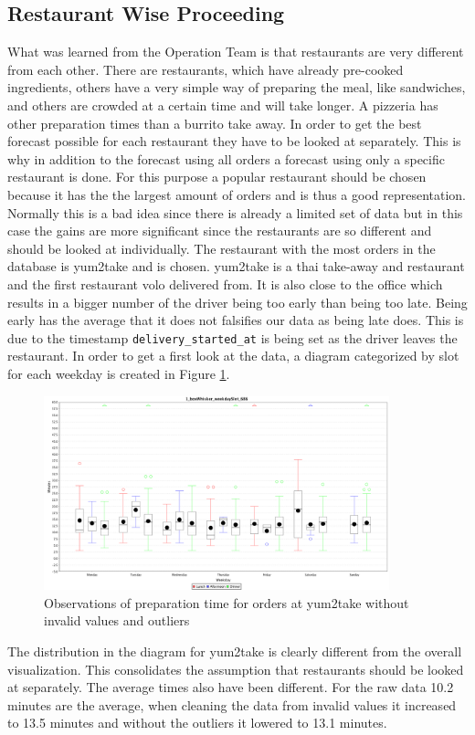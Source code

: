 \subsection{Restaurant Wise Proceeding}\label{subsection:Restaurant Wise Proceeding}
What was learned from the Operation Team is that restaurants are very different from each other. There are restaurants, which have already pre-cooked ingredients, others have a very simple way of preparing the meal, like sandwiches, and others are crowded at a certain time and will take longer. A pizzeria has other preparation times than a burrito take away.\newline
In order to get the best forecast possible for each restaurant they have to be looked at separately. This is why in addition to the forecast using all orders a forecast using only a specific restaurant is done. For this purpose a popular restaurant should be chosen because it has the the largest amount of orders and is thus a good representation. Normally this is a bad idea since there is already a limited set of data but in this case the gains are more significant since the restaurants are so different and should be looked at individually.\newline
The restaurant with the most orders in the database is yum2take and is chosen. yum2take is a thai take-away and restaurant and the first restaurant volo delivered from. It is also close to the office which results in a bigger number of the driver being too early than being too late. Being early has the average that it does not falsifies our data as being late does. This is due to the timestamp \texttt{delivery\_started\_at} is being set as the driver leaves the restaurant. In order to get a first look at the data, a diagram categorized by slot for each weekday is created in Figure \ref{fig:1_boxWhisker_weekdaySlot_686}.
\begin{figure}[h]
\begin{center}
\includegraphics[width=10cm]{images/1_boxWhisker_weekdaySlot_686.png}
\caption{Observations of preparation time for orders at yum2take without invalid values and outliers}
\label{fig:1_boxWhisker_weekdaySlot_686}
\end{center}
\end{figure}
The distribution in the diagram for yum2take is clearly different from the overall visualization. This consolidates the assumption that restaurants should be looked at separately. The average times also have been different. For the raw data 10.2 minutes are the average, when cleaning the data from invalid values it increased to 13.5 minutes and without the outliers it lowered to 13.1 minutes.
